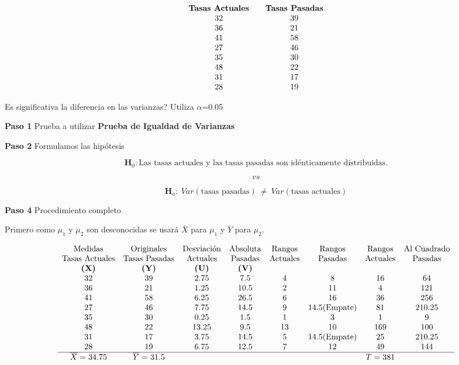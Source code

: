 \documentclass[
  a4paper,
  oneside,
  openany]{book}
\begin{document}
\[
\begin{array}{c c c} 
\textbf{Tasas Actuales} &  & \textbf{Tasas Pasadas} \\
32 & & 39 \\
36 & & 21 \\
41 & & 58 \\
27 & & 46 \\
35 & & 30 \\
48 & & 22 \\
31 & & 17 \\
28 & & 19 \\
\end{array}
\]

Es significativa la diferencia en las varianzas? Utiliza \(\alpha\)=0.05

\textbf{Paso 1} Prueba a utilizar \textbf{Prueba de Igualdad de Varianzas}

\textbf{Paso 2} Formulamos las hipótesis

\[\textbf{H}_0: \mbox{Las tasas actuales y las tasas pasadas son idénticamente distribuidas.}\]

\[vs\]

\[\textbf{H}_a: \ Var(\mbox{tasas pasadas}) \ \neq  \ Var(\mbox{tasas actuales})\]

\textbf{Paso 4} Procedimiento completo

Primero como \(\mu_{1}\) y \(\mu_{2}\) son desconocidas se usará \(\overline{X}\) para \(\mu_{1}\) y \(\overline{Y}\) para \(\mu_{2}\).

\[
\begin{array}{c c c c c c c c }
\mbox{Medidas} & \mbox{Originales} & \mbox{Desviación} & \mbox{Absoluta} & \mbox{Rangos} & \mbox{Rangos} & \mbox{Rangos} & \mbox{Al Cuadrado} \\
\mbox{Tasas Actuales} & \mbox{Tasas Pasadas} & \mbox{Actuales} & \mbox{Pasadas} & \mbox{Actuales} & \mbox{Pasadas}& \mbox{Actuales} & \mbox{Pasadas} \\
\textbf{(X)} & \textbf{(Y)} & \textbf{(U)}   & \textbf{(V)}  &     &               &     &         \\
32  & 39  & 2.75  & 7.5  &  4  &  8            & 16  &  64         \\
36  & 21  & 1.25  & 10.5 &  2  &  11           &  4  &  121    \\
41  & 58  & 6.25  & 26.5 &  6 &   16           & 36  &  256       \\
27  & 46  & 7.75  & 14.5 &  9  &  14.5(\mbox{Empate})& 81  &  210.25       \\
35  & 30  & 0.25  & 1.5  &  1  &  3            & 1   &  9     \\
48  & 22  & 13.25 & 9.5  &  13 &  10           & 169 &  100    \\
31  & 17  & 3.75  & 14.5 &  5  &  14.5(\mbox{Empate})& 25  &  210.25     \\
28  & 19  & 6.75  & 12.5 &  7  &  12           & 49  &  144   \\
\hline
\overline{X}= 34.75 & \overline{Y}= 31.5 & & & & & T=381
\end{array}
\]
\end{document}
